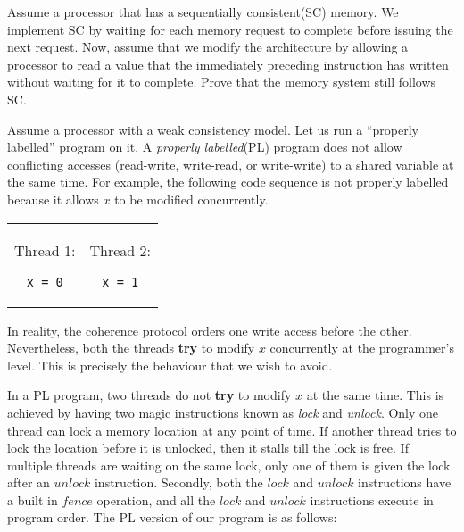 \begin{ExerciseList}
\Exercise[difficulty=3]
Assume a processor that has a sequentially consistent(SC) memory. We implement SC by waiting for each memory request to
complete before issuing the next request. Now, assume that we modify the architecture by allowing a processor to read a
value that the immediately preceding instruction has written without waiting for it to complete. Prove that the memory system
still follows SC.


\Exercise[difficulty=3]
Assume a processor with a weak consistency model. Let us run a ``properly labelled'' program on it.
A {\em properly labelled}(PL) program does not allow conflicting accesses (read-write, write-read, or write-write)
to a shared variable at the same time. For example, the following code sequence is not 
properly labelled because it allows $x$ to be modified concurrently.  

\begin{tabular}{cc}
\begin{minipage}{0.4\textwidth}
Thread 1:
\begin{Verbatim}
x = 0
\end{Verbatim}
\end{minipage}

&
\begin{minipage}{0.4\textwidth}
Thread 2:
\begin{Verbatim}
x = 1
\end{Verbatim}
\end{minipage}

\end{tabular}

In reality, the coherence protocol orders one write access before the other. Nevertheless, 
both the threads {\bf try} to modify $x$ concurrently at the programmer's level. This is precisely the behaviour
that we wish to avoid. 

In a PL program, two threads do not {\bf try} to modify $x$ at the same time. This is achieved
by having two magic instructions known as {\em lock} and {\em unlock}. Only one thread
can lock a memory location at any point of time. If another thread tries to lock the location
before it is unlocked, then it stalls till the lock is free. If multiple threads are waiting
on the same lock, only one of them is given the lock after an $unlock$ instruction. Secondly,
both the $lock$ and $unlock$ instructions have a built in $fence$ operation, and all the $lock$
and $unlock$ instructions execute in program order. The PL version
of our program is as follows: \\



\end{ExerciseList}
